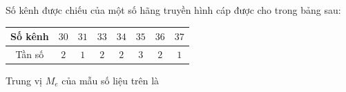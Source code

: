 \begin{ex}
Số kênh được chiếu của một số hãng truyền hình cáp được cho trong bảng sau:
\begin{center}
\begin{tabular}{|c|c|c|c|c|c|c|c|}\hline
Số kênh & $30$ & $31$ & $33$ & $34$ & $35$ & $36$ & $37$\\\hline
Tần số & $2$ & $1$ & $2$ & $2$ & $3$ & $2$ & $1$\\\hline
\end{tabular}
\end{center}
Trung vị $M_e$ của mẫu số liệu trên là
\end{ex}
